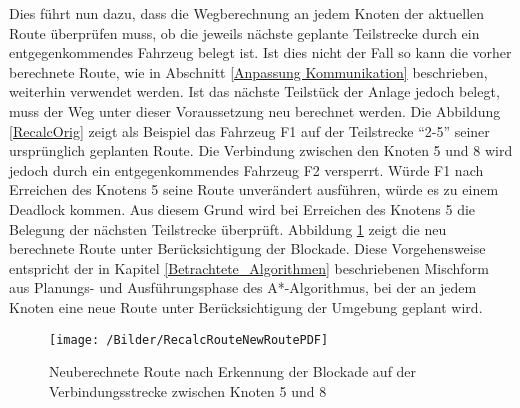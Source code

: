 		Dies führt nun dazu, dass die Wegberechnung an jedem Knoten der aktuellen Route überprüfen muss, ob die jeweils nächste geplante Teilstrecke durch ein entgegenkommendes Fahrzeug belegt ist. Ist dies nicht der Fall so kann die vorher berechnete Route, wie in Abschnitt \ref{Anpassung Kommunikation} beschrieben, weiterhin verwendet werden. Ist das nächste Teilstück der Anlage jedoch belegt, muss der Weg unter dieser Voraussetzung neu berechnet werden. Die Abbildung \ref{RecalcOrig} zeigt als Beispiel das Fahrzeug F1 auf der Teilstrecke "`2-5"' seiner ursprünglich geplanten Route. Die Verbindung zwischen den Knoten 5 und 8 wird jedoch durch ein entgegenkommendes Fahrzeug F2 versperrt. Würde F1 nach Erreichen des Knotens 5 seine Route unverändert ausführen, würde es zu einem Deadlock kommen. Aus diesem Grund wird bei Erreichen des Knotens 5 die Belegung der nächsten Teilstrecke überprüft. Abbildung \ref{RecalcNew} zeigt die neu berechnete Route unter Berücksichtigung der Blockade. Diese Vorgehensweise entspricht der in Kapitel \ref{Betrachtete_Algorithmen} beschriebenen Mischform aus Planungs- und Ausführungsphase des A*-Algorithmus, bei der an jedem Knoten eine neue Route unter Berücksichtigung der Umgebung geplant wird.
		
		\begin{figure}
			\centering
			\texttt{[image: /Bilder/RecalcRouteNewRoutePDF]}
			\vspace{0.2cm}
			\caption{Neuberechnete Route nach Erkennung der Blockade auf der Verbindungsstrecke zwischen Knoten 5 und 8}\label{RecalcNew}
		\end{figure}
	
